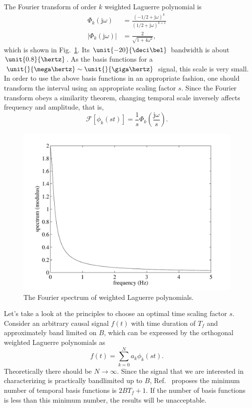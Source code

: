 \documentclass[conference, a4paper]{IEEEtran}
\begin{document}
The Fourier transform of order $k$ weighted Laguerre polynomial is
\begin{equation}
\begin{split}
\Phi_k(\mathrm{j}\omega)&=\frac{(-1/2+\mathrm{j}\omega)^k}{(1/2+\mathrm{j}\omega)^{k+1}}\\
\lvert{\Phi_k(\mathrm{j}\omega)}\rvert&=\frac{2}{\sqrt{1+4\omega^2}},
\end{split}
\end{equation}
which is shown in Fig.~\ref{fig1}. Its $\unit{-20}{\deci\bel}$
bandwidth is about $\unit{0.8}{\hertz}$. As the basis functions for a
$\unit{}{\mega\hertz}\sim\unit{}{\giga\hertz}$ signal, this scale is very
small. In order to use the above basis functions in an appropriate
fashion, one should transform the interval using an appropriate scaling 
factor $s$. Since the Fourier transform obeys a similarity theorem,
changing temporal scale inversely affects frequency and amplitude, that is,
\begin{equation}
\mathscr{F}[\phi_k(st)]=\frac{1}{s}\Phi_k(\frac{\mathrm{j}\omega}{s}).
\end{equation}
\begin{figure}
    \centering
    \includegraphics[scale=0.48]{lagu.pdf}
    \caption{The Fourier spectrum of weighted Laguerre polynomials.}
    \label{fig1}
\end{figure}

Let's take a look at the principles to choose an optimal time scaling factor
$s$. Consider an arbitrary causal signal $f(t)$ with time duration of $T_f$
and approximately band limited on $B$, which can be expressed by the
orthogonal weighted Laguerre polynomials as
\begin{equation}
f(t)=\sum_{k=0}^{N}a_k\phi_k(st).
\end{equation}
Theoretically there should be $N\rightarrow\infty$. Since the signal that
we are interested in characterizing is practically bandlimited up to
$B$, Ref.~\cite{jung:time:2003} proposes the minimum number of temporal basis
functions is $2BT_f+1$. If the number of basis functions is less than
this minimum number, the results will be unacceptable.
\end{document}
